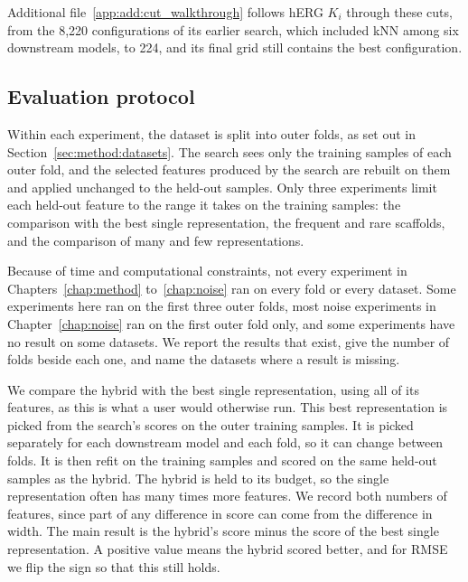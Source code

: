 Additional file~\ref{app:add:cut_walkthrough} follows hERG $K_i$ through these cuts, from the 8,220 configurations of its earlier search, which included kNN among six downstream models, to 224, and its final grid still contains the best configuration.

\subsection{Evaluation protocol}\label{sec:method:evaluation}

Within each experiment, the dataset is split into outer folds, as set out in Section~\ref{sec:method:datasets}. The search sees only the training samples of each outer fold, and the selected features produced by the search are rebuilt on them and applied unchanged to the held-out samples. Only three experiments limit each held-out feature to the range it takes on the training samples: the comparison with the best single representation, the frequent and rare scaffolds, and the comparison of many and few representations.

Because of time and computational constraints, not every experiment in Chapters~\ref{chap:method} to~\ref{chap:noise} ran on every fold or every dataset. Some experiments here ran on the first three outer folds, most noise experiments in Chapter~\ref{chap:noise} ran on the first outer fold only, and some experiments have no result on some datasets. We report the results that exist, give the number of folds beside each one, and name the datasets where a result is missing. 

We compare the hybrid with the best single representation, using all of its features, as this is what a user would otherwise run. This best representation is picked from the search's scores on the outer training samples. It is picked separately for each downstream model and each fold, so it can change between folds. It is then refit on the training samples and scored on the same held-out samples as the hybrid. The hybrid is held to its budget, so the single representation often has many times more features. We record both numbers of features, since part of any difference in score can come from the difference in width. The main result is the hybrid's score minus the score of the best single representation. A positive value means the hybrid scored better, and for RMSE we flip the sign so that this still holds.

